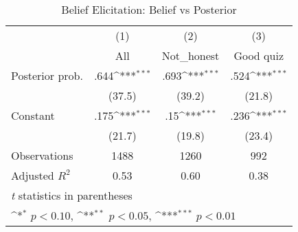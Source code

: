 \begin{table}[htbp]\centering
\def\sym#1{\ifmmode^{#1}\else\(^{#1}\)\fi}
\caption{Belief Elicitation: Belief vs Posterior}
\begin{tabular}{l*{3}{c}}
\hline\hline
                &\multicolumn{1}{c}{(1)}&\multicolumn{1}{c}{(2)}&\multicolumn{1}{c}{(3)}\\
                &\multicolumn{1}{c}{All}&\multicolumn{1}{c}{Not\_honest}&\multicolumn{1}{c}{Good quiz}\\
\hline
Posterior prob. &     .644\sym{***}&     .693\sym{***}&     .524\sym{***}\\
                &   (37.5)         &   (39.2)         &   (21.8)         \\
Constant        &     .175\sym{***}&      .15\sym{***}&     .236\sym{***}\\
                &   (21.7)         &   (19.8)         &   (23.4)         \\
\hline
Observations    &     1488         &     1260         &      992         \\
Adjusted \(R^{2}\)&     0.53         &     0.60         &     0.38         \\
\hline\hline
\multicolumn{4}{l}{\footnotesize \textit{t} statistics in parentheses}\\
\multicolumn{4}{l}{\footnotesize \sym{*} \(p<0.10\), \sym{**} \(p<0.05\), \sym{***} \(p<0.01\)}\\
\end{tabular}
\end{table}
